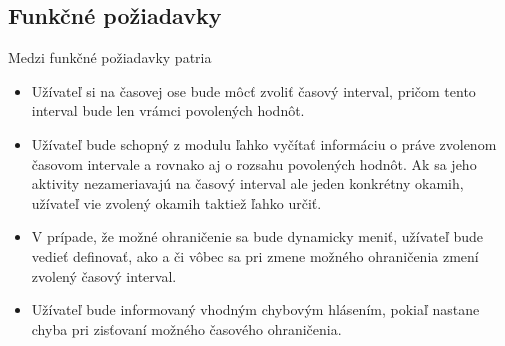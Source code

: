 \documentclass[
  digital, %
  twoside, %
  notable,   %
  nolof,   %
  nolot,   %
]{fithesis3}
\begin{document}
\subsection{Funkčné požiadavky}
\label{funkcne_poziadavky}
Medzi funkčné požiadavky patria
\begin{itemize}
\item Užívateľ si na časovej ose bude môcť zvoliť časový interval, pričom tento interval bude len vrámci povolených hodnôt.
\item Užívateľ bude schopný z modulu ľahko vyčítať informáciu o práve zvolenom časovom intervale a rovnako aj o rozsahu povolených hodnôt. Ak sa jeho aktivity nezameriavajú na časový interval ale jeden konkrétny okamih, užívateľ vie zvolený okamih taktiež ľahko určiť.
\item V prípade, že možné ohraničenie sa bude dynamicky meniť, užívateľ bude vedieť definovať, ako a či vôbec sa pri zmene možného ohraničenia zmení zvolený časový interval.
\item Užívateľ bude informovaný vhodným chybovým hlásením, pokiaľ nastane chyba pri zisťovaní možného časového ohraničenia.
\end{itemize}
\end{document}

